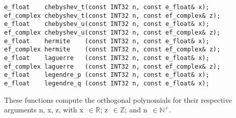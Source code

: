 \begin{lstlisting}
e_float    chebyshev_t(const INT32 n, const e_float& x);
ef_complex chebyshev_t(const INT32 n, const ef_complex& z);
e_float    chebyshev_u(const INT32 n, const e_float& x);
ef_complex chebyshev_u(const INT32 n, const ef_complex& z);
e_float    hermite    (const INT32 n, const e_float& x);
ef_complex hermite    (const INT32 n, const ef_complex& z);
e_float    laguerre   (const INT32 n, const e_float& x);
ef_complex laguerre   (const INT32 n, const ef_complex& z);
e_float    legendre_p (const INT32 n, const e_float& x);
e_float    legendre_q (const INT32 n, const e_float& x);
\end{lstlisting}

\vspace{6.0pt}

 These functions compute the orthogonal polynomials
for their respective arguments {\courier n}, {\courier x}, {\courier z},
with {\courier x}~$\in\mathbb{R}$; {\courier z}~$\in\mathbb{Z}$;
and {\courier n}~$\in\mathbb{N}^{+}$.

